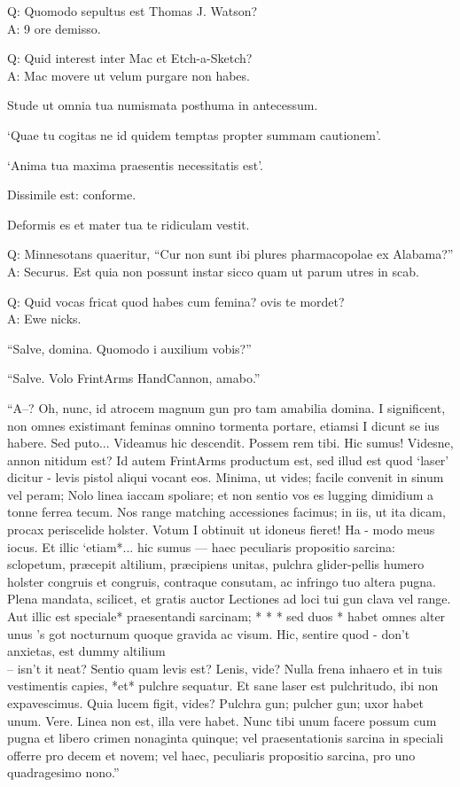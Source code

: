 \documentclass[titlepage,12pt]{memoir}
\begin{document}
Q: Quomodo sepultus est Thomas J. Watson?\\
A: 9 ore demisso.

Q: Quid interest inter Mac et Etch-a-Sketch?\\
A: Mac movere ut velum purgare non habes.

Stude ut omnia tua numismata posthuma in antecessum.

‘Quae tu cogitas ne id quidem temptas propter summam cautionem’.

‘Anima tua maxima praesentis necessitatis est’.

Dissimile est: conforme.

Deformis es et mater tua te ridiculam vestit.

Q: Minnesotans quaeritur, “Cur non sunt ibi plures pharmacopolae ex Alabama?”\\
A: Securus. Est quia non possunt instar sicco quam ut parum
utres in scab.

Q: Quid vocas fricat quod habes cum femina?
ovis te mordet?\\
A: Ewe nicks.

“Salve, domina. Quomodo i auxilium vobis?”

“Salve. Volo FrintArms HandCannon, amabo.”

“A--? Oh, nunc, id atrocem magnum gun pro tam amabilia domina. I
significent, non omnes existimant feminas omnino tormenta portare, etiamsi I
dicunt se ius habere. Sed puto... Videamus
hic descendit. Possem rem tibi. Hic sumus!
Videsne, annon nitidum est? Id autem FrintArms productum est,
sed illud est quod ‘laser’ dicitur - levis pistol aliqui vocant
eos. Minima, ut vides; facile convenit in sinum vel peram; Nolo
linea iaccam spoliare; et non sentio vos es lugging dimidium a
tonne ferrea tecum. Nos range matching accessiones facimus;
in iis, ut ita dicam, procax periscelide holster. Votum I
obtinuit ut idoneus fieret! Ha - modo meus iocus. Et
illic ‘etiam*... hic sumus — haec peculiaris propositio sarcina: sclopetum,
præcepit altilium, præcipiens unitas, pulchra glider-pellis humero holster
congruis et congruis, contraque consutam, ac infringo tuo
altera pugna. Plena mandata, scilicet, et gratis auctor
Lectiones ad loci tui gun clava vel range. Aut illic est speciale*
praesentandi sarcinam; * * * sed duos * habet omnes alter unus ’s got
nocturnum quoque gravida ac visum. Hic, sentire quod - don’t
anxietas, est dummy altilium \\-- isn’t it neat? Sentio quam levis est?
Lenis, vide? Nulla frena inhaero et in tuis vestimentis capies, *et*
pulchre sequatur. Et sane laser est pulchritudo, ibi
non expavescimus. Quia lucem figit, vides? Pulchra gun;
pulcher gun; uxor habet unum. Vere. Linea non est, illa
vere habet. Nunc tibi unum facere possum cum pugna et libero
crimen nonaginta quinque; vel praesentationis sarcina in speciali
offerre pro decem et novem; vel haec, peculiaris propositio sarcina, pro
uno quadragesimo nono.”
\end{document}
